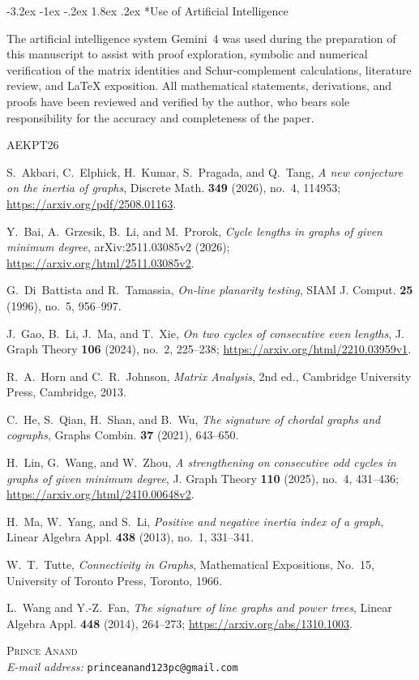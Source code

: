\documentclass[10pt,letterpaper]{article}
\makeatletter
\renewcommand\section{\@startsection{section}{1}{\z@}%
  {-3.2ex \@plus -1ex \@minus -.2ex}%
  {1.8ex \@plus .2ex}%
  {\normalfont\large\bfseries}}
\theoremstyle{zetaplain}
\theoremstyle{zetadef}
\theoremstyle{remark}
\numberwithin{equation}{section}
\makeatother
\begin{document}
\section*{Use of Artificial Intelligence}

The artificial intelligence system Gemini~4 was used during the preparation of this manuscript to assist with proof exploration, symbolic and numerical verification of the matrix identities and Schur-complement calculations, literature review, and LaTeX exposition. All mathematical statements, derivations, and proofs have been reviewed and verified by the author, who bears sole responsibility for the accuracy and completeness of the paper.

\begin{thebibliography}{AEKPT26}

S.~Akbari, C.~Elphick, H.~Kumar, S.~Pragada, and Q.~Tang,
\emph{A new conjecture on the inertia of graphs},
Discrete Math. \textbf{349} (2026), no.~4, 114953;
\url{https://arxiv.org/pdf/2508.01163}.

Y.~Bai, A.~Grzesik, B.~Li, and M.~Prorok,
\emph{Cycle lengths in graphs of given minimum degree},
arXiv:2511.03085v2 (2026);
\url{https://arxiv.org/html/2511.03085v2}.

G.~Di~Battista and R.~Tamassia,
\emph{On-line planarity testing},
SIAM J. Comput. \textbf{25} (1996), no.~5, 956--997.

J.~Gao, B.~Li, J.~Ma, and T.~Xie,
\emph{On two cycles of consecutive even lengths},
J. Graph Theory \textbf{106} (2024), no.~2, 225--238;
\url{https://arxiv.org/html/2210.03959v1}.

R.~A.~Horn and C.~R.~Johnson,
\emph{Matrix Analysis}, 2nd ed.,
Cambridge University Press, Cambridge, 2013.

C.~He, S.~Qian, H.~Shan, and B.~Wu,
\emph{The signature of chordal graphs and cographs},
Graphs Combin. \textbf{37} (2021), 643--650.

H.~Lin, G.~Wang, and W.~Zhou,
\emph{A strengthening on consecutive odd cycles in graphs of given minimum degree},
J. Graph Theory \textbf{110} (2025), no.~4, 431--436;
\url{https://arxiv.org/html/2410.00648v2}.

H.~Ma, W.~Yang, and S.~Li,
\emph{Positive and negative inertia index of a graph},
Linear Algebra Appl. \textbf{438} (2013), no.~1, 331--341.

W.~T.~Tutte,
\emph{Connectivity in Graphs},
Mathematical Expositions, No.~15, University of Toronto Press, Toronto, 1966.

L.~Wang and Y.-Z.~Fan,
\emph{The signature of line graphs and power trees},
Linear Algebra Appl. \textbf{448} (2014), 264--273;
\url{https://arxiv.org/abs/1310.1003}.

\end{thebibliography}

\vspace{1.2em}
\noindent\textsc{Prince Anand}\\
\textit{E-mail address:} \texttt{princeanand123pc@gmail.com}
\end{document}
